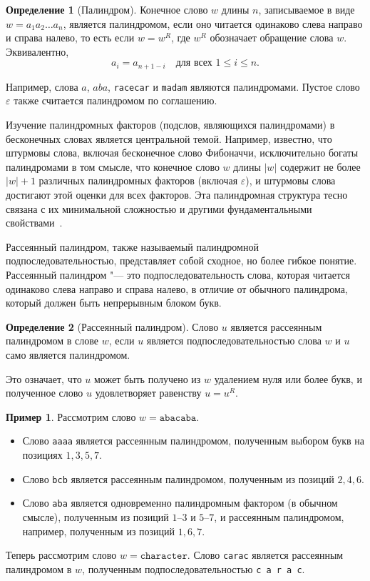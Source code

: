 \documentclass[a4paper,14pt]{extreport}
\theoremstyle{plain}
\theoremstyle{definition}
\newtheorem{definition}{Определение}[section]
\newtheorem{example}{Пример}
\theoremstyle{remark}
\begin{document}
\begin{definition}[Палиндром]
	Конечное слово $w$ длины $n$, записываемое в виде $w = a_1 a_2 \dots a_n$, является палиндромом, если оно читается одинаково слева направо и справа налево, то есть если $w = w^R$, где $w^R$ обозначает обращение слова $w$. Эквивалентно,
	\begin{equation}
		a_i = a_{n+1-i} \quad \text{для всех } 1 \leq i \leq n.
	\end{equation}
\end{definition}

Например, слова $a$, $aba$, \texttt{racecar} и \texttt{madam} являются палиндромами. Пустое слово $\varepsilon$ также считается палиндромом по соглашению.

Изучение палиндромных факторов (подслов, являющихся палиндромами) в бесконечных словах является центральной темой. Например, известно, что штурмовы слова, включая бесконечное слово Фибоначчи, исключительно богаты палиндромами в том смысле, что конечное слово $w$ длины $|w|$ содержит не более $|w|+1$ различных палиндромных факторов (включая $\varepsilon$), и штурмовы слова достигают этой оценки для всех факторов. Эта палиндромная структура тесно связана с их минимальной сложностью и другими фундаментальными свойствами~\cite{Droubay}.

Рассеянный палиндром, также называемый палиндромной подпоследовательностью, представляет собой сходное, но более гибкое понятие. Рассеянный палиндром "--- это подпоследовательность слова, которая читается одинаково слева направо и справа налево, в отличие от обычного палиндрома, который должен быть непрерывным блоком букв.

\begin{definition}[Рассеянный палиндром]
	Слово $u$ является рассеянным палиндромом в слове $w$, если $u$ является подпоследовательностью слова $w$ и $u$ само является палиндромом.
\end{definition}

Это означает, что $u$ может быть получено из $w$ удалением нуля или более букв, и полученное слово $u$ удовлетворяет равенству $u = u^R$.

\begin{example}
	Рассмотрим слово $w = \texttt{abacaba}$.
	\begin{itemize}
		\item Слово \texttt{aaaa} является рассеянным палиндромом, полученным выбором букв на позициях $1,3,5,7$.
		\item Слово \texttt{bcb} является рассеянным палиндромом, полученным из позиций $2,4,6$.
		\item Слово \texttt{aba} является одновременно палиндромным фактором (в обычном смысле), полученным из позиций $1$--$3$ и $5$--$7$, и рассеянным палиндромом, например, полученным из позиций $1,6,7$.
	\end{itemize}
	Теперь рассмотрим слово $w = \texttt{character}$. Слово \texttt{carac} является рассеянным палиндромом в $w$, полученным подпоследовательностью \texttt{c a r a c}.
\end{example}
\end{document}
